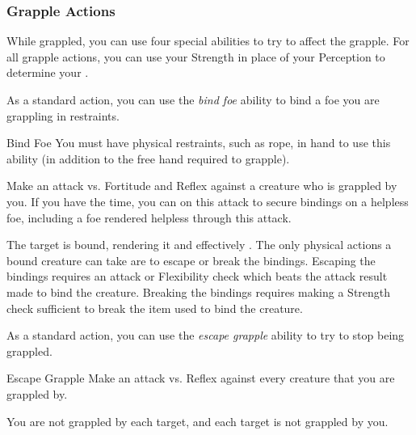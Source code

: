         \subsubsection{Grapple Actions}\label{Grapple Actions}
            While grappled, you can use four special abilities to try to affect the grapple.
            For all grapple actions, you can use your Strength in place of your Perception to determine your .

             As a standard action, you can use the \textit{bind foe} ability to bind a foe you are grappling in restraints.

            \begin{freeability}{Bind Foe}
                You must have physical restraints, such as rope, in hand to use this ability (in addition to the free hand required to grapple).

                Make an attack vs. Fortitude and Reflex against a creature who is grappled by you.
                If you have the time, you can  on this attack to secure bindings on a helpless foe, including a foe rendered helpless through this attack.

                \hit The target is bound, rendering it  and effectively .
                The only physical actions a bound creature can take are to escape or break the bindings.
                Escaping the bindings requires an attack or Flexibility check which beats the attack result made to bind the creature.
                Breaking the bindings requires making a Strength check sufficient to break the item used to bind the creature.
            \end{freeability}

             As a standard action, you can use the \textit{escape grapple} ability to try to stop being grappled.

            \begin{freeability}{Escape Grapple}
                Make an attack vs. Reflex against every creature that you are grappled by.

                \hit You are not grappled by each target, and each target is not grappled by you.
            \end{freeability}


